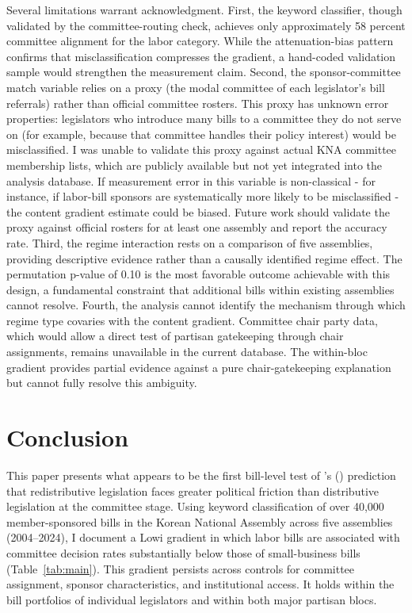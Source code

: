 \documentclass[11pt]{article}
\begin{document}
Several limitations warrant acknowledgment. First, the keyword classifier, though validated by the committee-routing check, achieves only approximately 58 percent committee alignment for the labor category. While the attenuation-bias pattern confirms that misclassification compresses the gradient, a hand-coded validation sample would strengthen the measurement claim. Second, the sponsor-committee match variable relies on a proxy (the modal committee of each legislator's bill referrals) rather than official committee rosters. This proxy has unknown error properties: legislators who introduce many bills to a committee they do not serve on (for example, because that committee handles their policy interest) would be misclassified. I was unable to validate this proxy against actual KNA committee membership lists, which are publicly available but not yet integrated into the analysis database. If measurement error in this variable is non-classical - for instance, if labor-bill sponsors are systematically more likely to be misclassified - the content gradient estimate could be biased. Future work should validate the proxy against official rosters for at least one assembly and report the accuracy rate. Third, the regime interaction rests on a comparison of five assemblies, providing descriptive evidence rather than a causally identified regime effect. The permutation p-value of 0.10 is the most favorable outcome achievable with this design, a fundamental constraint that additional bills within existing assemblies cannot resolve. Fourth, the analysis cannot identify the mechanism through which regime type covaries with the content gradient. Committee chair party data, which would allow a direct test of partisan gatekeeping through chair assignments, remains unavailable in the current database. The within-bloc gradient provides partial evidence against a pure chair-gatekeeping explanation but cannot fully resolve this ambiguity.


\section{Conclusion}
\label{sec:conclusion}

This paper presents what appears to be the first bill-level test of \citeauthor{lowi1964}'s (\citeyear{lowi1964}) prediction that redistributive legislation faces greater political friction than distributive legislation at the committee stage. Using keyword classification of over 40,000 member-sponsored bills in the Korean National Assembly across five assemblies (2004--2024), I document a Lowi gradient in which labor bills are associated with committee decision rates substantially below those of small-business bills (Table~\ref{tab:main}). This gradient persists across controls for committee assignment, sponsor characteristics, and institutional access. It holds within the bill portfolios of individual legislators and within both major partisan blocs.
\end{document}
